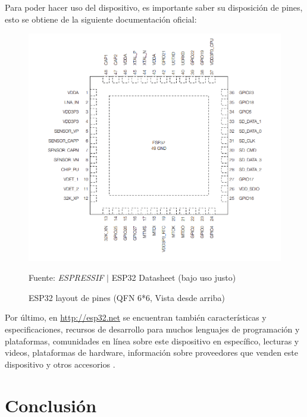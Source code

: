 \documentclass[conference]{IEEEtran}
\begin{document}
Para poder hacer uso del dispositivo, es importante saber su disposición de pines, esto se obtiene de la siguiente documentación oficial:

\begin{figure}[H]
\centering
\includegraphics[width=0.3\paperwidth]{images/esp32-pin-layout.png}
\caption{ESP32 layout de pines (QFN 6*6, Vista desde arriba)} \footnotesize
Fuente: \textit{ESPRESSIF} $\mid$ ESP32 Datasheet \cite{espressif-systems-shanghai-co-ltd-2022B} (bajo uso justo)
\end{figure}

Por último, en \href{http://esp32.net}{http://esp32.net} se encuentran también características y especificaciones, recursos de desarrollo para muchos lenguajes de programación y plataformas, comunidades en línea sobre este dispositivo en específico, lecturas y videos, plataformas de hardware, información sobre proveedores que venden este dispositivo y otros accesorios \cite{esp32net-esp32net-iot}.

\section{}




\section{Conclusión}\label{sec:conclusion}




\printbibliography
\end{document}
